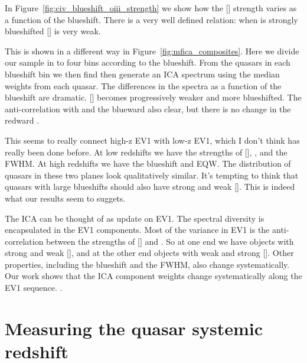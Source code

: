 In Figure~\ref{fig:civ_blueshift_oiii_strength} we show how the [] strength varies as a function of the  blueshift. 
There is a very well defined relation: when  is strongly blueshifted [] is very weak. 

This is shown in a different way in Figure~\ref{fig:mfica_composites}. 
Here we divide our sample in to four bins according to the  blueshift. 
From the quasars in each  blueshift bin we then find then generate an ICA spectrum using the median weights from each quasar. 
The differences in the spectra as a function of the  blueshift are dramatic. 
[] becomes progressively weaker and more blueshifted.
The anti-correlation with  and the blueward  also clear, but there is no change in the redward . 

This seems to really connect high-z EV1 with low-z EV1, which I don't think has really been done before. 
At low redshifts we have the strengths of [], , and the \hb FWHM. 
At high redshifts we have the  blueshift and EQW. 
The distribution of quasars in these two planes look qualitatively similar.  
It's tempting to think that quasars with large  blueshifts should also have strong  and weak []. 
This is indeed what our results seem to suggets. 

The ICA can be thought of as update on EV1. 
The spectral diversity is encapsulated in the EV1 components. 
Most of the variance in EV1 is the anti-correlation between the strengths of [] and . 
So at one end we have objects with strong  and weak [], and at the other end objects with weak  and strong []. 
Other properties, including the  blueshift and the \hb FWHM, also change systematically. 
Our work shows that the ICA component weights change systematically along the EV1 sequence. 
. 






\section{Measuring the quasar systemic redshift}

